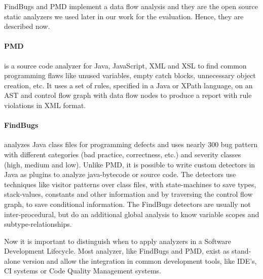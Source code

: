 \documentclass[conference]{IEEEtran}
\begin{document}
FindBugs and PMD implement a data flow analysis and they are the open source static analyzers we used later in our work for the evaluation.
Hence, they are described now.

\paragraph{PMD}
is a source code analyzer for Java, JavaScript, XML and XSL to find common programming flaws like unused variables, empty catch blocks, unnecessary object creation, etc.
It uses a set of rules, specified in a Java or XPath language, on an AST and control flow graph with data flow nodes to produce a report with rule violations in XML format.


\paragraph{FindBugs}
analyzes Java class files for programming defects and uses nearly 300 bug pattern with different categories (bad practice, correctness, etc.) and severity classes (high, medium and low)\cite{Findbugs}.
Unlike PMD, it is possible to write custom detectors in Java as plugins to analyze java-bytecode or source code.
The detectors use techniques like visitor patterns over class files, with state-machines to save types, stack-values, constants and other information and by traversing the control flow graph, to save conditional information.
The FindBugs detectors are usually not inter-procedural, but do an additional global analysis to know variable scopes and subtype-relationships.


Now it is important to distinguish when to apply analyzers in a Software Development Lifecycle.
Most analyzer, like FindBugs and PMD, exist as stand-alone version and allow the integration in common development tools, like IDE's, CI systems or Code Quality Management systems.




\end{document}
